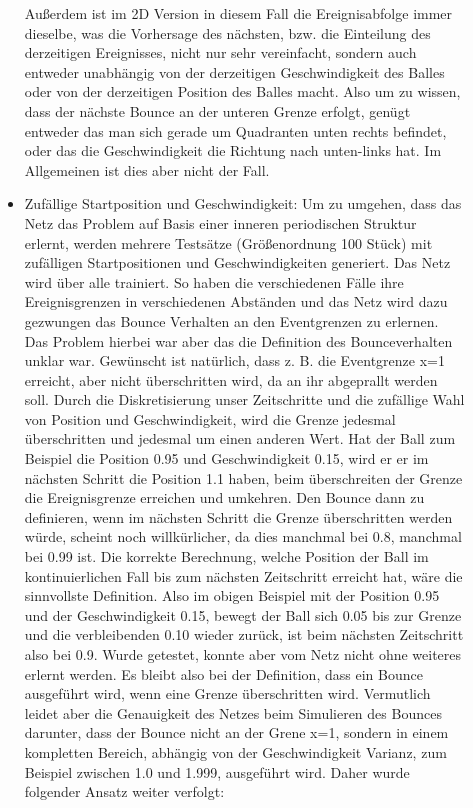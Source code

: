 \begin{description}
\begin{itemize}
		Außerdem ist im 2D Version in diesem Fall die Ereignisabfolge immer dieselbe, was die Vorhersage des nächsten, bzw. die Einteilung des derzeitigen Ereignisses, nicht nur sehr vereinfacht, sondern auch entweder unabhängig von der derzeitigen Geschwindigkeit des Balles oder von der derzeitigen Position des Balles macht. Also um zu wissen, dass der nächste Bounce an der unteren Grenze erfolgt, genügt entweder das man sich gerade um Quadranten unten rechts befindet, oder das die Geschwindigkeit die Richtung nach unten-links hat. Im Allgemeinen ist dies aber nicht der Fall. 
		\item Zufällige Startposition und Geschwindigkeit: Um zu umgehen, dass das Netz das Problem auf Basis einer inneren periodischen Struktur erlernt, werden mehrere Testsätze (Größenordnung 100 Stück) mit zufälligen Startpositionen und Geschwindigkeiten generiert. Das Netz wird über alle trainiert. So haben die verschiedenen Fälle ihre Ereignisgrenzen in verschiedenen Abständen und das Netz wird dazu gezwungen das Bounce Verhalten an den Eventgrenzen zu erlernen. Das Problem hierbei war aber das die Definition des Bounceverhalten unklar war. Gewünscht ist natürlich, dass z. B. die Eventgrenze x=1 erreicht, aber nicht überschritten wird, da an ihr abgeprallt werden soll. Durch die Diskretisierung unser Zeitschritte und die zufällige Wahl von Position und Geschwindigkeit, wird die Grenze jedesmal überschritten und jedesmal um einen anderen Wert. Hat der Ball zum Beispiel die Position 0.95 und Geschwindigkeit 0.15, wird er er im nächsten Schritt die Position 1.1 haben, beim überschreiten der Grenze die Ereignisgrenze erreichen und umkehren. Den Bounce dann zu definieren, wenn im nächsten Schritt die Grenze überschritten werden würde, scheint noch willkürlicher, da dies manchmal bei 0.8, manchmal bei 0.99 ist. Die korrekte Berechnung, welche Position der Ball im kontinuierlichen Fall bis zum nächsten Zeitschritt erreicht hat, wäre die sinnvollste Definition. Also im obigen Beispiel mit der Position 0.95 und der Geschwindigkeit 0.15, bewegt der Ball sich 0.05 bis zur Grenze und die verbleibenden 0.10 wieder zurück, ist beim nächsten Zeitschritt also bei 0.9. Wurde getestet, konnte aber vom Netz nicht ohne weiteres erlernt werden. Es bleibt also bei der Definition, dass ein Bounce ausgeführt wird, wenn eine Grenze überschritten wird. Vermutlich leidet aber die Genauigkeit des Netzes beim Simulieren des Bounces darunter, dass der Bounce nicht an der Grene x=1, sondern in einem kompletten Bereich, abhängig von der Geschwindigkeit Varianz, zum Beispiel zwischen 1.0 und 1.999, ausgeführt wird. Daher wurde folgender Ansatz weiter verfolgt:

\end{itemize}
\end{description}
